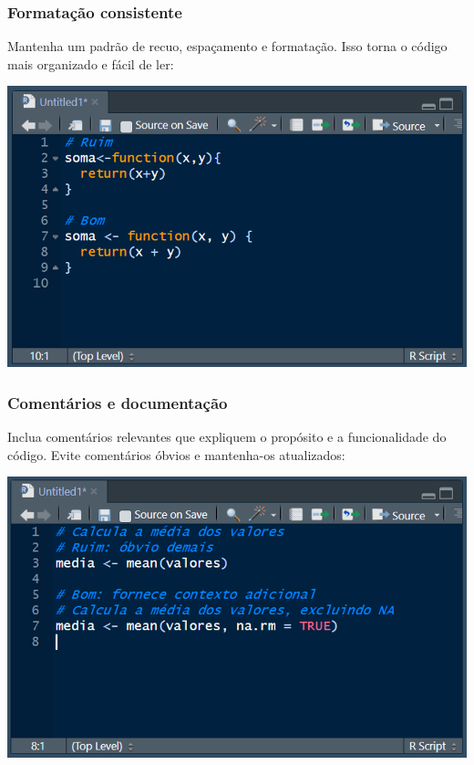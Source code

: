 \documentclass[
]{book}
\begin{document}
\subsubsection{Formatação consistente}\label{formatauxe7uxe3o-consistente}

Mantenha um padrão de recuo, espaçamento e formatação. Isso torna o código mais organizado e fácil de ler:

\includegraphics{images/clipboard-2461203963.png}

\subsubsection{Comentários e documentação}\label{comentuxe1rios-e-documentauxe7uxe3o}

Inclua comentários relevantes que expliquem o propósito e a funcionalidade do código. Evite comentários óbvios e mantenha-os atualizados:

\includegraphics{images/clipboard-978422987.png}
\end{document}
